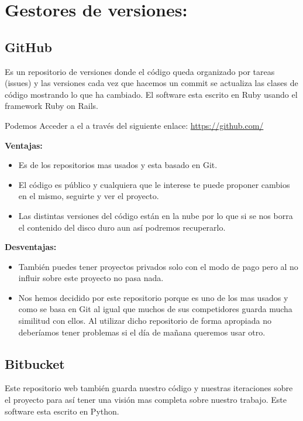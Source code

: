 \section{Gestores de versiones:}
\subsection{GitHub}
Es un repositorio de versiones donde el código queda organizado por tareas (issues) y las versiones cada vez que hacemos un commit se actualiza las clases de código mostrando lo que ha cambiado.
El software esta escrito en Ruby usando el framework Ruby on Rails.

Podemos Acceder a el a través del siguiente enlace: 
\url{https://github.com/}



\textbf{Ventajas:}

\begin{itemize}
\item Es de los repositorios mas usados y esta basado en Git.

\item El código es público y cualquiera que le interese te puede proponer cambios en el mismo, seguirte y ver el proyecto.

\item Las distintas versiones del código están en la nube por lo que si se nos borra el contenido del disco duro aun así podremos recuperarlo.
\end{itemize}

\textbf{Desventajas:}

\begin{itemize}
\item También puedes tener proyectos privados solo con el modo de pago pero al no influir sobre este proyecto no pasa nada.

\item Nos hemos decidido por este repositorio porque es uno de los mas usados y como se basa en Git al igual que muchos de sus competidores guarda mucha similitud con ellos.
Al utilizar dicho repositorio de forma apropiada no deberíamos tener problemas si el día de mañana queremos usar otro.
\end{itemize}

\subsection{Bitbucket}
Este repositorio web también guarda nuestro código y nuestras iteraciones sobre el proyecto para así tener una visión mas completa sobre nuestro trabajo.
Este software esta escrito en Python.

